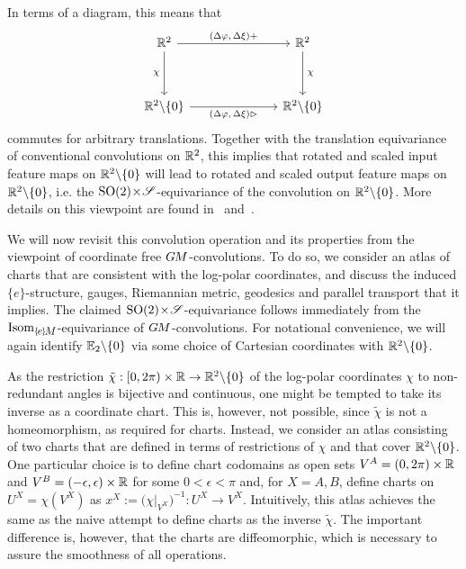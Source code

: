 In terms of a diagram, this means that
\begin{equation}
\begin{tikzcd}[row sep=3.5em, column sep=7.em]
    \R^2
        \arrow[r, "(\Delta\varphi {,}\, \Delta\xi) +"]
        \arrow[d, "\chi\,"']
    & \R^2
        \arrow[d, "\,\chi"]
    \\
    \R^2 \backslash \{0\}
        \arrow[r, "(\Delta\varphi {,}\, \Delta\xi) \rhd"']
    & \R^2 \backslash \{0\}
\end{tikzcd}
\end{equation}
commutes for arbitrary translations.
Together with the translation equivariance of conventional convolutions on $\mathbb{R}^2$, this implies that rotated and scaled input feature maps on $\mathbb{R}^2 \backslash \{0\}$ will lead to rotated and scaled output feature maps on $\mathbb{R}^2 \backslash \{0\}$, i.e. the ${\operatorname{SO}(2) \!\times\! \mathscr{S}}$-equivariance of the convolution on $\mathbb{R}^2 \backslash \{0\}$.
More details on this viewpoint are found in~\cite{esteves2017polar} and~\cite{blatt1994canonical}.


We will now revisit this convolution operation and its properties from the viewpoint of coordinate free $G\mkern-1.4muM$-convolutions.
To do so, we consider an atlas of charts that are consistent with the log-polar coordinates, and discuss the induced $\{e\}$-structure, gauges, Riemannian metric, geodesics and parallel transport that it implies.
The claimed ${\operatorname{SO}(2) \!\times\! \mathscr{S}}$-equivariance follows immediately from the $\IsomeM$-equivariance of $G\mkern-1.4muM$-convolutions.
For notational convenience, we will again identify $\mathbb{E}_2 \backslash \{0\}$ via some choice of Cartesian coordinates with $\mathbb{R}^2 \backslash \{0\}$.

As the restriction $\tilde{\chi}: [0,2\pi) \times \mathbb{R} \to \mathbb{R}^2 \backslash \{0\}$ of the log-polar coordinates $\chi$ to non-redundant angles is bijective and continuous, one might be tempted to take its inverse as a coordinate chart.
This is, however, not possible, since $\tilde{\chi}$ is not a homeomorphism, as required for charts.
Instead, we consider an atlas consisting of two charts that are defined in terms of restrictions of $\chi$ and that cover $\mathbb{R}^2 \backslash \{0\}$.
One particular choice is to define chart codomains as open sets $V^A = (0,2\pi) \times \mathbb{R}$ and $V^B = (-\epsilon,\epsilon) \times \mathbb{R}$ for some $0< \epsilon <\pi$ and, for $X=A,B$, define charts on $U^X = \chi(V^X)$ as $x^X := \big( \chi\big|_{V^X} \big)^{-1} : U^X \to V^X$.
Intuitively, this atlas achieves the same as the naive attempt to define charts as the inverse $\tilde{\chi}$.
The important difference is, however, that the charts are diffeomorphic, which is necessary to assure the smoothness of all operations.


